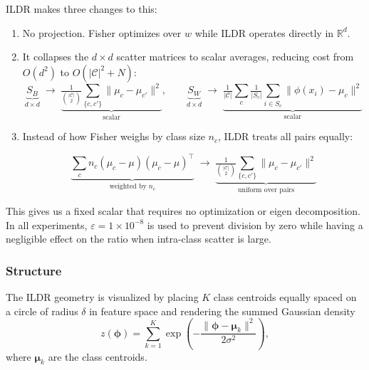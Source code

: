 \documentclass{article}
\begin{document}
\vspace{9pt}

ILDR makes three changes to this:

\begin{enumerate}

    \item No projection. Fisher optimizes over $w$ while ILDR operates 
    directly in $\mathbb{R}^d$.


    \item 
    It collapses the $d\times d$ scatter matrices to scalar averages, reducing cost from $O(d^2)$ to 
    $O(|\mathcal{C}|^2 + N)$:
    \begin{equation}
        \underbrace{S_B}_{d\times d}
        \;\longrightarrow\;
        \underbrace{\text{} 
        \tfrac{1}{\binom{|\mathcal{C}|}{2}}
        \sum_{\{c,c'\}} \|\mu_c - \mu_{c'}\|^2}_{\text{scalar}},
        \qquad
        \underbrace{S_W}_{d\times d}
        \;\longrightarrow\;
        \underbrace{\text{} 
        \tfrac{1}{|\mathcal{C}|}\sum_c \tfrac{1}{|S_c|}
        \sum_{i \in S_c} \|\phi(x_i) - \mu_c\|^2}_{\text{scalar}}
    \end{equation}

    \item 

    Instead of how Fisher weighs by class size $n_c$, ILDR treats all pairs equally:

    \begin{equation}
        \underbrace{\sum_c n_c(\mu_c-\mu)(\mu_c-\mu)^\top
        }_{\text{weighted by } n_c}
        \;\longrightarrow\;
        \underbrace{\tfrac{1}{\binom{|\mathcal{C}|}{2}}
        \sum_{\{c,c'\}} \|\mu_c - \mu_{c'}\|^2
        }_{\text{uniform over pairs}}
    \end{equation}

\end{enumerate}

This gives us a fixed scalar that requires no optimization or eigen decomposition. 
In all experiments, $\varepsilon = 1 \times 10^{-8}$ is used to prevent division by zero while having a negligible effect on the ratio when intra-class scatter is large.

\subsubsection{Structure}

The ILDR geometry is visualized by placing $K$ class centroids equally spaced on a circle of radius $\delta$ in feature space and rendering the summed Gaussian density
\[
z(\boldsymbol{\phi}) = \sum_{k=1}^{K} \exp\!\left(-\frac{\|\boldsymbol{\phi} - \boldsymbol{\mu}_k\|^2}{2\sigma^2}\right),
\]
where $\boldsymbol{\mu}_k$ are the class centroids.
\vspace{14pt}
\end{document}
